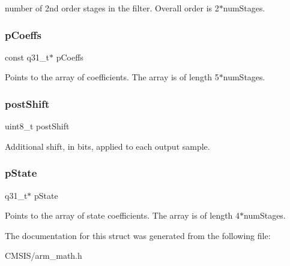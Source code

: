 number of 2nd order stages in the filter. Overall order is 2$\ast$num\+Stages. \mbox{\label{structarm__biquad__casd__df1__inst__q31_a80e7fdf4747dbda8eadb2663fb4be317}} 
\subsubsection{\texorpdfstring{pCoeffs}{pCoeffs}}
{\footnotesize\ttfamily const q31\+\_\+t$\ast$ p\+Coeffs}

Points to the array of coefficients. The array is of length 5$\ast$num\+Stages. \mbox{\label{structarm__biquad__casd__df1__inst__q31_a74050e9f36542bd56f4052381a82ae8f}} 
\subsubsection{\texorpdfstring{postShift}{postShift}}
{\footnotesize\ttfamily uint8\+\_\+t post\+Shift}

Additional shift, in bits, applied to each output sample. \mbox{\label{structarm__biquad__casd__df1__inst__q31_adee4ba3ee8869865af7d8fa08ca913d6}} 
\subsubsection{\texorpdfstring{pState}{pState}}
{\footnotesize\ttfamily q31\+\_\+t$\ast$ p\+State}

Points to the array of state coefficients. The array is of length 4$\ast$num\+Stages. 

The documentation for this struct was generated from the following file\+:\begin{DoxyCompactItemize}
\item 
C\+M\+S\+I\+S/arm\+\_\+math.\+h\end{DoxyCompactItemize}
